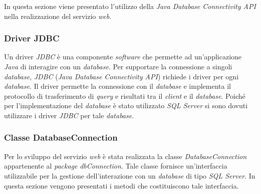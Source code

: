 In questa sezione viene presentato l'utilizzo della \textit{Java Database Connectivity API} nella realizzazione del servizio \textit{web}.

\subsubsection{Driver JDBC}

Un driver \textit{JDBC} è una componente \textit{software} che permette ad un'applicazione \textit{Java} di interagire con un \textit{database}. Per supportare la connessione a singoli \textit{database}, \textit{JDBC} (\textit{Java Database Connectivity API}) richiede i driver per ogni \textit{database}. Il driver permette la connessione con il \textit{database} e implementa il protocollo di trasferimento di \textit{query} e risultati tra il \textit{client} e il \textit{database}. Poiché per l'implementazione del \textit{database} è stato utilizzato \textit{SQL Server} si sono dovuti utilizzare i driver \textit{JDBC} per tale \textit{database}.

\subsubsection{Classe DatabaseConnection} \label{dbconnect}

Per lo sviluppo del servizio \textit{web} è stata realizzata la classe \textit{DatabaseConnection} appartenente al \textit{package} \textit{dbConnection}. Tale classe fornisce un'interfaccia utilizzabile per la gestione dell'interazione con un \textit{database} di tipo \textit{SQL Server}. In questa sezione vengono presentati i metodi che costituiscono tale interfaccia.


